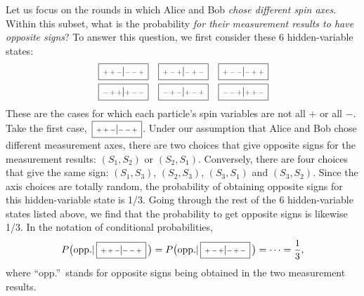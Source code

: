 \documentclass[prx,12pt]{revtex4-2}
\def\hvbox[#1]#2{\,\boxed{\scalebox{0.7}{$\,#1$}|\scalebox{0.7}{$#2\,$}}}
\begin{document}
Let us focus on the rounds in which Alice and Bob \textit{chose
  different spin axes}.  Within this subset, what is the probability
\textit{for their measurement results to have opposite signs}?  To
answer this question, we first consider these 6 hidden-variable
states:
\begin{align*}
  \begin{aligned}
    \hvbox[++-]{--+} \;\;\;
    \hvbox[+-+]{-+-} \;\;\;
    \hvbox[+--]{-++}\\
    \hvbox[-++]{+--} \;\;\;
    \hvbox[-+-]{+-+} \;\;\;
    \hvbox[--+]{++-}
  \end{aligned}
\end{align*}
These are the cases for which each particle's spin variables are not
all $+$ or all $-$.  Take the first case, $\hvbox[++-]{--+}$.  Under
our assumption that Alice and Bob chose different measurement axes,
there are two choices that give opposite signs for the measurement
results: $(S_1,S_2)$ or $(S_2,S_1)$.  Conversely, there are four
choices that give the same sign: $(S_1,S_3)$, $(S_2,S_3)$, $(S_3,S_1)$
and $(S_3, S_2)$.  Since the axis choices are totally random, the
probability of obtaining opposite signs for this hidden-variable state
is 1/3.  Going through the rest of the 6 hidden-variable states listed
above, we find that the probability to get opposite signs is likewise
1/3.  In the notation of conditional probabilities,
\begin{equation}
  P\big(\textrm{opp.} | \hvbox[++-]{--+}\,\big) =
  P\big(\textrm{opp.} | \hvbox[+-+]{-+-}\,\big) = \cdots = \frac{1}{3},
  \label{bell1}
\end{equation}
where ``opp.''~stands for opposite signs being obtained in the two
measurement results.
\end{document}
